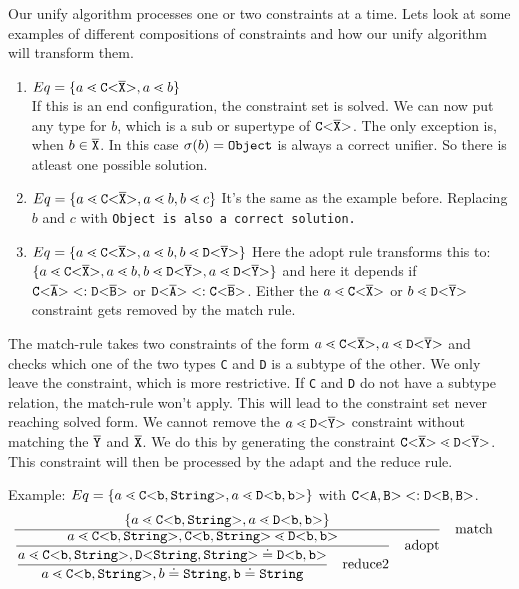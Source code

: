 Our unify algorithm processes one or two constraints at a time.
Lets look at some examples of different compositions of constraints
and how our unify algorithm will transform them.

\begin{enumerate}
\item $Eq = \{ a \lessdot \mathtt{C {\tt <} \overline{\tt X} {\tt >} }, a \lessdot b \}$ \\
If this is an end configuration, the constraint set is solved.
We can now put any type for $b$, which is a sub or supertype of $\mathtt{C {\tt <} \overline{\tt X} {\tt >} }$.
The only exception is, when $b \in \overline{\tt X}$.
In this case $\sigma(b) = \tt{Object}$ is always a correct unifier.
So there is atleast one possible solution.

\item $Eq = \{ a \lessdot \mathtt{C {\tt <} \overline{\tt X} {\tt >} }, a \lessdot b, b \lessdot c \}$
It's the same as the example before.
Replacing $b$ and $c$ with \tt{Object} is also a correct solution. 

\item $Eq = \{ a \lessdot \mathtt{C {\tt <} \overline{\tt X} {\tt >} }, a \lessdot b, b \lessdot \mathtt{D {\tt <} \overline{\tt Y} {\tt >} } \}$
Here the adopt rule transforms this to:
$\{ a \lessdot \mathtt{C {\tt <} \overline{\tt X} {\tt >} }, a \lessdot b, b \lessdot \mathtt{D {\tt <} \overline{\tt Y} {\tt >} }, a \lessdot \mathtt{D {\tt <} \overline{\tt Y} {\tt >} } \}$
and here it depends if $\mathtt{C {\tt <} \overline{\tt A} {\tt >} } <: \mathtt{D {\tt <} \overline{\tt B} {\tt >} }$ or $\mathtt{D {\tt <} \overline{\tt A} {\tt >} } <: \mathtt{C {\tt <} \overline{\tt B} {\tt >} }$.
Either the $a \lessdot \mathtt{C {\tt <} \overline{\tt X} {\tt >} }$ or $b \lessdot \mathtt{D {\tt <} \overline{\tt Y} {\tt >} }$ constraint
gets removed by the match rule.


\end{enumerate}

The match-rule takes two constraints of the form $a \lessdot \mathtt{C {\tt <} \overline{\tt X} {\tt >} }, a \lessdot \mathtt{D {\tt <} \overline{\tt Y} {\tt >} }$
and checks which one of the two types \texttt{C} and \texttt{D} is a subtype of the other.
We only leave the constraint, which is more restrictive.
If \texttt{C} and \texttt{D} do not have a subtype relation, the match-rule won't apply.
This will lead to the constraint set never reaching solved form.
We cannot remove the $a \lessdot \mathtt{D {\tt <} \overline{\tt Y} {\tt >} }$ constraint without matching the
$\overline{\tt Y}$ and $\overline{\tt X}$.
We do this by generating the constraint $\mathtt{C {\tt <} \overline{\tt X} {\tt >} } \lessdot \mathtt{D {\tt <} \overline{\tt Y} {\tt >} }$.
This constraint will then be processed by the adapt and the reduce rule.

Example:
$Eq = \{ a \lessdot \mathtt{C {\tt <} b,\tt{String} {\tt >} }, a \lessdot \mathtt{D {\tt <} b,b {\tt >} } \}$
with $\mathtt{C {\tt <} A,B {\tt >} } <: \mathtt{D {\tt <} B,B {\tt >} }$.
\begin{align*}
\frac{\displaystyle 
    \{ a \lessdot \mathtt{C {\tt <} b,\tt{String} {\tt >} }, a \lessdot \mathtt{D {\tt <} b,b {\tt >} } \}
}{\displaystyle 
\frac{\displaystyle 
    a \lessdot \mathtt{C {\tt <} b,\tt{String} {\tt >} }, \mathtt{C {\tt <} b,\tt{String} {\tt >} } \lessdot \mathtt{D {\tt <} b,b {\tt >} }
}{\displaystyle 
    \frac{\displaystyle 
        a \lessdot \mathtt{C {\tt <} b,\tt{String} {\tt >} }, \mathtt{D {\tt <} \tt{String},\tt{String} {\tt >} } \doteq \mathtt{D {\tt <} b,b {\tt >} }
    }{\displaystyle 
        a \lessdot \mathtt{C {\tt <} b,\tt{String} {\tt >} }, b \doteq \tt{String}, b \doteq \tt{String}
    } \quad \text{reduce2}
} \quad \text{adopt}
} & \quad \text{match}
\end{align*}

